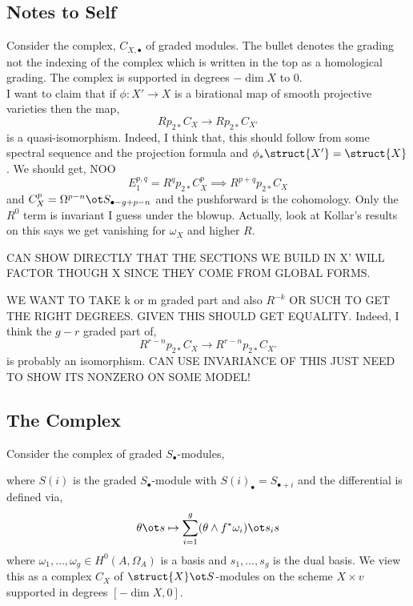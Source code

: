 \documentclass[12pt]{article}
\begin{document}
\subsection{Notes to Self}

Consider the complex, $C_{X, \bullet}$ of graded modules. The bullet denotes the grading not the indexing of the complex which is written in the top as a homological grading. The complex is supported in degrees $-\dim{X}$ to $0$.
\bigskip\\
I want to claim that if $\phi : X' \to X$ is a birational map of smooth projective varieties then the map,
\[ R p_{2 *} C_{X} \to R p_{2 *} C_{X'} \]
is a quasi-isomorphism. Indeed, I think that, this should follow from some spectral sequence and the projection formula and $\phi_* \struct{X'} = \struct{X}$. We should get, NOO
\[ E_1^{p,q} = R^q p_{2 *} C_X^p \implies R^{p+q} p_{2 *} C_X \]
and $C_X^p = \Omega^{p-n} \ot S_{\bullet - g + p - n}$ and the pushforward is the cohomology. Only the $R^0$ term is invariant I guess under the blowup. Actually, look at Kollar's results on this says we get vanishing for $\omega_X$ and higher $R$.

CAN SHOW DIRECTLY THAT THE SECTIONS WE BUILD IN X' WILL FACTOR THOUGH X SINCE THEY COME FROM GLOBAL FORMS.

WE WANT TO TAKE k or m graded part and also $R^{-k}$ OR SUCH TO GET THE RIGHT DEGREES. GIVEN THIS SHOULD GET EQUALITY. Indeed, I think the $g - r$ graded part of,
\[ R^{r-n} p_{2*} C_{X} \to R^{r-n} p_{2*} C_{X'} \]
is probably an isomorphism. CAN USE INVARIANCE OF THIS JUST NEED TO SHOW ITS NONZERO ON SOME MODEL!

\subsection{The Complex}

Consider the complex of graded $S_\bullet$-modules,
\begin{center}
\end{center}
where $S(i)$ is the graded $S_\bullet$-module with $S(i)_{\bullet} = S_{\bullet + i}$ and the differential is defined via,
\[ \theta \ot s \mapsto \sum_{i = 1}^g (\theta \wedge f^* \omega_i) \ot s_i s \]
where $\omega_1, \dots, \omega_g \in H^0(A, \Omega_A)$ is a basis and $s_1, \dots, s_g$ is the dual basis. We view this as a complex $C_X$ of $\struct{X} \ot S$-modules on the scheme $X \times v$ supported in degrees $[-\dim{X}, 0]$.
\end{document}
